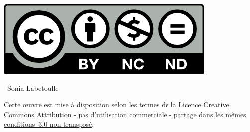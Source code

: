 \noindent\includegraphics{by-nc-nd}

\noindent\textcopyright~Sonia Labetoulle

\noindent Cette {\oe}uvre est mise à disposition selon les termes de 
la \href{http://creativecommons.org/licenses/by-nc-sa/3.0/}{Licence 
Creative Commons Attribution - pas d'utilisation commerciale - partage 
dans les mêmes conditions~3.0 non transposé}.

